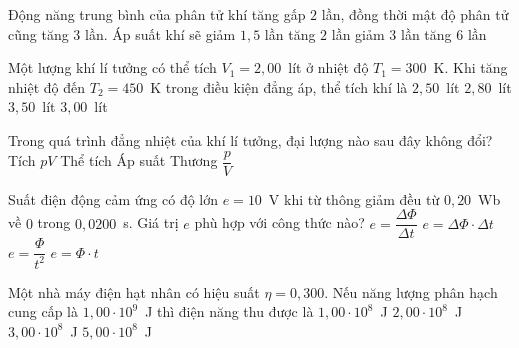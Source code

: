 	\begin{ex}%
		Động năng trung bình của phân tử khí tăng gấp $2$ lần, đồng thời mật độ phân tử cũng tăng $3$ lần. Áp suất khí sẽ
		\choice
		{giảm $1{,}5$ lần}
		{tăng $2$ lần}
		{giảm $3$ lần}
		{\True tăng $6$ lần}
	\end{ex}

	\begin{ex}%
		Một lượng khí lí tưởng có thể tích $V_1=2{,}00$~lít ở nhiệt độ $T_1=300$~K. Khi tăng nhiệt độ đến $T_2=450$~K trong điều kiện đẳng áp, thể tích khí là
		\choice
		{$2{,}50$~lít}
		{$2{,}80$~lít}
		{$3{,}50$~lít}
		{\True $3{,}00$~lít}
	\end{ex}

	\begin{ex}%
		Trong quá trình đẳng nhiệt của khí lí tưởng, đại lượng nào sau đây không đổi?
		\choice
		{\True Tích $pV$}
		{Thể tích}
		{Áp suất}
		{Thương $\dfrac{p}{V}$}
	\end{ex}

	\begin{ex}%
		Suất điện động cảm ứng có độ lớn $e=10$~V khi từ thông giảm đều từ $0{,}20$~Wb về $0$ trong $0{,}0200$~s. Giá trị $e$ phù hợp với công thức nào?
		\choice
		{\True $e=\dfrac{\Delta\Phi}{\Delta t}$}
		{$e=\Delta\Phi\cdot\Delta t$}
		{$e=\dfrac{\Phi}{t^2}$}
		{$e=\Phi\cdot t$}
	\end{ex}

	\begin{ex}%
		Một nhà máy điện hạt nhân có hiệu suất $\eta=0{,}300$. Nếu năng lượng phân hạch cung cấp là $1{,}00\cdot 10^9$~J thì điện năng thu được là
		\choice
		{$1{,}00\cdot 10^8$~J}
		{$2{,}00\cdot 10^8$~J}
		{\True $3{,}00\cdot 10^8$~J}
		{$5{,}00\cdot 10^8$~J}
	\end{ex}

